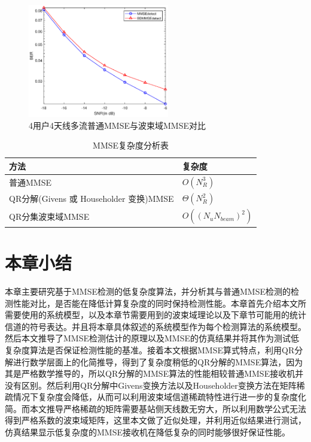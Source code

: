 \documentclass[bachelor,nocolorlinks, printoneside]{seuthesis} %
\begin{document}
\begin{Main}
\begin{figure}[htbp!]
\end{figure}
\begin{figure}[htbp!]
	\centering \includegraphics[width=0.55\textwidth]{img/3_7.eps} \caption{4用户4天线多流普通MMSE与波束域MMSE对比}
\end{figure}

\begin{table}[htbp]
	\centering
	\caption{\label{tab:complexity}MMSE复杂度分析表}
	\begin{tabular}{ll}
		\toprule
		方法 & 复杂度 \\
		\bottomrule
		普通MMSE & $O(N_R^3)$ \\
		QR分解(Givens 或 Householder 变换)MMSE & $\Theta(N_R^2)$ \\
		QR分集波束域MMSE & $O((N_uN_{beam})^2)$ \\
	    \bottomrule
	\end{tabular}
\end{table}


\section{本章小结}
本章主要研究基于MMSE检测的低复杂度算法，并分析其与普通MMSE检测的检测性能对比，是否能在降低计算复杂度的同时保持检测性能。本章首先介绍本文所需要使用的系统模型，以及本章节需要用到的波束域理论以及下章节可能用的统计信道的符号表达。并且将本章具体叙述的系统模型作为每个检测算法的系统模型。然后本文推导了MMSE检测估计的原理以及MMSE的仿真结果并将其作为测试低复杂度算法是否保证检测性能的基准。接着本文根据MMSE算式特点，利用QR分解进行数学层面上的化简推导，得到了复杂度稍低的QR分解的MMSE算法，因为其是严格数学推导的，所以QR分解的MMSE算法的性能相较普通MMSE接收机并没有区别。然后利用QR分解中Givens变换方法以及Householder变换方法在矩阵稀疏情况下复杂度会降低，从而可以利用波束域信道稀疏特性进行进一步的复杂度化简。而本文推导严格稀疏的矩阵需要基站侧天线数无穷大，所以利用数学公式无法得到严格系数的波束域矩阵，这里本文做了近似处理，并利用近似结果进行测试，仿真结果显示低复杂度的MMSE接收机在降低复杂的同时能够很好保证性能。



\end{Main}
\end{document}
